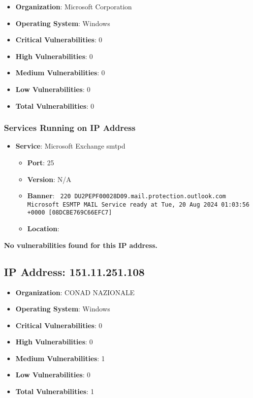 \documentclass{article}
\begin{document}
\begin{itemize}
    \item \textbf{Organization}: Microsoft Corporation
    \item \textbf{Operating System}:  Windows 
    \item \textbf{Critical Vulnerabilities}: 0
    \item \textbf{High Vulnerabilities}: 0
    \item \textbf{Medium Vulnerabilities}: 0
    \item \textbf{Low Vulnerabilities}: 0
    \item \textbf{Total Vulnerabilities}: 0
\end{itemize}

\subsubsection*{Services Running on IP Address}

\begin{itemize}
    
        \item \textbf{Service}: Microsoft Exchange smtpd
        \begin{itemize}
            \item \textbf{Port}: 25
            \item \textbf{Version}:  N/A 
            \item \textbf{Banner}: \texttt{
                220 DU2PEPF00028D09.mail.protection.outlook.com Microsoft ESMTP MAIL Service ready at Tue, 20 Aug 2024 01:03:56 +0000 [08DCBE769C66EFC7]
            }
            \item \textbf{Location}: \href{  }{  }
        \end{itemize}
    
\end{itemize}


\textbf{No vulnerabilities found for this IP address.}




\clearpage



\subsection*{IP Address: 151.11.251.108}

\begin{itemize}
    \item \textbf{Organization}: CONAD NAZIONALE
    \item \textbf{Operating System}:  Windows 
    \item \textbf{Critical Vulnerabilities}: 0
    \item \textbf{High Vulnerabilities}: 0
    \item \textbf{Medium Vulnerabilities}: 1
    \item \textbf{Low Vulnerabilities}: 0
    \item \textbf{Total Vulnerabilities}: 1
\end{itemize}
\end{document}
